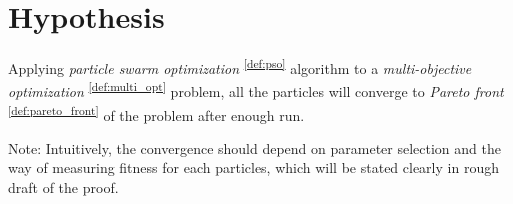 \documentclass[12pt]{article}
\begin{document}
\section{Hypothesis}

\begin{hyp}[Convergence]
\label{thm:convergence}
Applying \emph{particle swarm optimization} \textsuperscript{\ref{def:pso}} algorithm to a \emph{multi-objective optimization} \textsuperscript{\ref{def:multi_opt}} problem, all the particles will converge to \emph{Pareto front} \textsuperscript{\ref{def:pareto_front}} of the problem after enough run.
\end{hyp}

Note: Intuitively, the convergence should depend on parameter selection and the way of measuring fitness for each particles, which will be stated clearly in rough draft of the proof.

%
%
\end{document}
